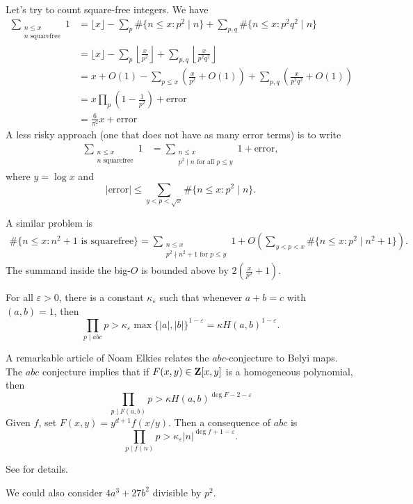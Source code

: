Let's try to count square-free integers. We have 
\begin{align*}
  \sum_{\substack{n\leqslant x \\ n\text{ squarefree}}} 1 
    &= \lfloor x\rfloor - \sum_p \#\{n\leqslant x:p^2\mid n\} + \sum_{p,q} \#\{n\leqslant x:p^2 q^2\mid n\} \\
    &= \lfloor x\rfloor - \sum_p \left\lfloor\frac{x}{p^2}\right\rfloor + \sum_{p,q} \left\lfloor\frac{x}{p^2 q^2}\right\rfloor \\
    &= x+O(1) - \sum_{p\leqslant x} \left(\frac{x}{p^2} + O(1)\right) + \sum_{p,q} \left(\frac{x}{p^2 q^2}+O(1)\right) \\
    &= x\prod_p \left(1-\frac{1}{p^2}\right) + \text{error} \\
    &= \frac{6}{\pi^2} x + \text{error}
\end{align*}
A less risky approach (one that does not have as many error terms) is to write 
\begin{align*}
  \sum_{\substack{n\leqslant x \\ n\text{ squarefree}}} 1
    &= \sum_{\substack{n\leqslant x \\ p^2\mid n\text{ for all }p\leqslant y}} 1 + \text{error} ,
\end{align*}
where $y=\log x$ and 
\[
  |\text{error}| \leqslant \sum_{y<p<\sqrt x} \# \{n\leqslant x:p^2\mid n\} .
\]

A similar problem is 
\begin{align*}
  \#\{n\leqslant x:n^2+1\text{ is squarefree}\} = \sum_{\substack{n\leqslant x \\ p^2\nmid n^2+1\text{ for }p\leqslant y}} 1 + O\left(\sum_{y<p<x} \# \{n\leqslant x:p^2\mid n^2+1\}\right) .
\end{align*}
The summand inside the big-$O$ is bounded above by 
$2\left(\frac{x}{p^2} + 1\right)$. 

\begin{conjecture}
For all $\varepsilon>0$, there is a constant $\kappa_\varepsilon$ such that 
whenever $a+b=c$ with $(a,b)=1$, then 
\[
  \prod_{p\mid a b c} p > \kappa_\varepsilon \max\{|a|,|b|\}^{1-\varepsilon} = \kappa H(a,b)^{1-\varepsilon} .
\]
\end{conjecture}
A remarkable article of Noam Elkies relates the $abc$-conjecture to 
Belyi maps. The $abc$ conjecture implies that if $F(x,y)\in \mathbf{Z}[x,y]$ is a 
homogeneous polynomial, then 
\[
  \prod_{p\mid F(a,b)} p > \kappa H(a,b)^{\deg F-2-\varepsilon}
\]
Given $f$, set $F(x,y) = y^{d+1} f(x/y)$. Then a consequence of $abc$ is 
\[
  \prod_{p\mid f(n)} p > \kappa_\varepsilon |n|^{\deg f+1-\varepsilon} .
\]

See \cite{e91} for details. 

We could also consider $4 a^3+ 27 b^2$ divisible by $p^2$. 




